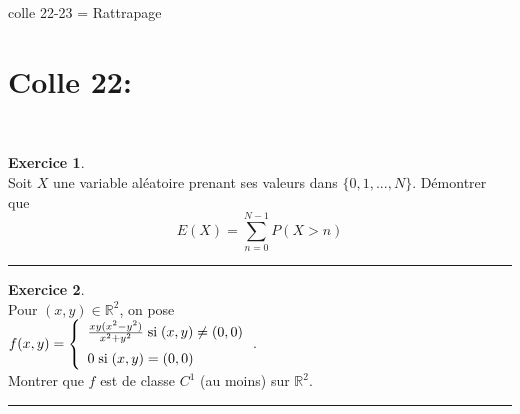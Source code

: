 \documentclass[a4paper,10pt]{article}
\theoremstyle{definition}
\theoremstyle{definition}
\newtheorem{exo}{Exercice}
\newcommand{\R}{\mathbb{R}}
\begin{document}
 	
	
	\begin{center}
		\Large \sc colle 22-23 = Rattrapage 
	\end{center}




\section*{Colle 22:}\hfill\\%
\begin{minipage}{1\linewidth}
	\begin{minipage}[t]{0.48\linewidth}
		\raggedright
		
	
\begin{exo}\quad\\
	
	Soit $X$ une variable aléatoire prenant ses valeurs dans $\{0,1,...,N\}$. Démontrer que 
	$$E(X) = \sum_{n=0}^{N-1} P(X>n)$$
	
	\centering
	\rule{1\linewidth}{0.6pt}
\end{exo}

		\begin{exo}\quad\\[0.2cm]
	Pour  $(x,y)\in\R^2$, on pose \\[0.2cm]$f(x,y) =\left\{
	\begin{array}{l}
	\frac{xy(x^2-y^2)}{x^2+y^2}\;\text{si}\;(x,y)\neq(0,0)\\
	\rule{0mm}{5mm}0\;\text{si}\;(x,y)=(0,0)
	\end{array}
	\right.$.\hfil\\[0.2cm] Montrer que $f$ est de classe $C^1$ (au moins) sur $\R^2$.
	
	
	\centering
	\rule{1\linewidth}{0.6pt}
\end{exo}	



		
		
		
	\end{minipage}	
	\hfill\vrule\hfill
	\begin{minipage}[t]{0.48\linewidth}
		\raggedright
		

\end{minipage}
\end{minipage}
\end{document}
